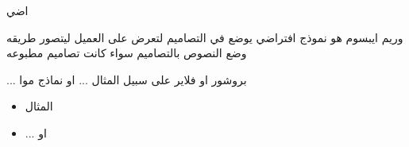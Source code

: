 \documentclass{beamer}
\begin{document}
\begin{frame}{اضي}


  وريم ايبسوم هو نموذج افتراضي
  يوضع في التصاميم لتعرض على العميل ليتصور طريقه
  وضع النصوص بالتصاميم سواء كانت تصاميم
  مطبوعه

  ... بروشور او فلاير على سبيل المثال ... او نماذج موا

  \begin{itemize}
    \item  المثال
    \item  ... او
  \end{itemize}
\end{frame}
\end{document}
